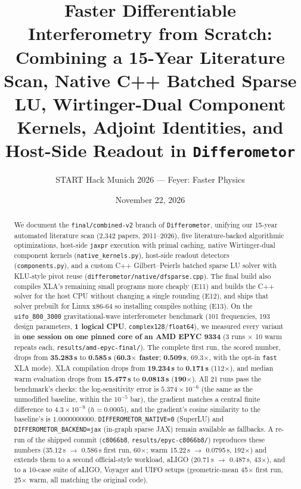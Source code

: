\documentclass[11pt,a4paper]{article}
\title{\textbf{Faster Differentiable Interferometry from Scratch:}\\
\large Combining a 15-Year Literature Scan, Native C++ Batched Sparse LU, Wirtinger-Dual Component Kernels, Adjoint Identities, and Host-Side Readout in \texttt{Differometor}}
\author{START Hack Munich 2026 --- Feyer: Faster Physics}
\date{November 22, 2026}
\begin{document}
\maketitle

\begin{abstract}
We document the \texttt{final/combined-v2} branch of \texttt{Differometor}, unifying our 15-year automated literature scan (2,342 papers, 2011--2026), five literature-backed algorithmic optimizations, host-side \texttt{jaxpr} execution with primal caching, native Wirtinger-dual component kernels (\texttt{native\_kernels.py}), host-side readout detectors (\texttt{components.py}), and a custom C++ Gilbert--Peierls batched sparse LU solver with KLU-style pivot reuse (\texttt{differometor/native/dfsparse.cpp}). The final build also compiles XLA's remaining small programs more cheaply (E11) and builds the C++ solver for the host CPU without changing a single rounding (E12), and ships that solver prebuilt for Linux x86-64 so installing compiles nothing (E13). On the \texttt{uifo\_800\_3000} gravitational-wave interferometer benchmark (101 frequencies, 193 design parameters, \textbf{1 logical CPU}, \texttt{complex128}/\texttt{float64}), we measured every variant in \textbf{one session on one pinned core of an AMD EPYC 9334} (3 runs $\times$ 10 warm repeats each, \texttt{results/amd-epyc-final/}). The complete first run, the scored number, drops from \textbf{35.283\,s} to \textbf{0.585\,s} (\textbf{60.3$\times$ faster}; \textbf{0.509\,s}, 69.3$\times$, with the opt-in \texttt{fast} XLA mode). XLA compilation drops from \textbf{19.234\,s} to \textbf{0.171\,s} (112$\times$), and median warm evaluation drops from \textbf{15.477\,s} to \textbf{0.0813\,s} (\textbf{190$\times$}). All 21 runs pass the benchmark's checks: the log-sensitivity error is $5.374\times 10^{-6}$ (the same as the unmodified baseline, within the $10^{-5}$ bar), the gradient matches a central finite difference to $4.3\times 10^{-9}$ ($h=0.0005$), and the gradient's cosine similarity to the baseline's is $1.0000000000$. \texttt{DIFFEROMETOR\_NATIVE=0} (SuperLU) and \texttt{DIFFEROMETOR\_BACKEND=jax} (in-graph sparse JAX) remain available as fallbacks. A re-run of the shipped commit (\texttt{c8066b8}, \texttt{results/epyc-c8066b8/}) reproduces these numbers (35.12\,s $\to$ 0.586\,s first run, 60$\times$; warm 15.22\,s $\to$ 0.0795\,s, 192$\times$) and extends them to a second official-style workload, aLIGO (20.71\,s $\to$ 0.487\,s, 43$\times$), and to a 10-case suite of aLIGO, Voyager and UIFO setups (geometric-mean 45$\times$ first run, 25$\times$ warm, all matching the original code).
\end{abstract}
\end{document}
